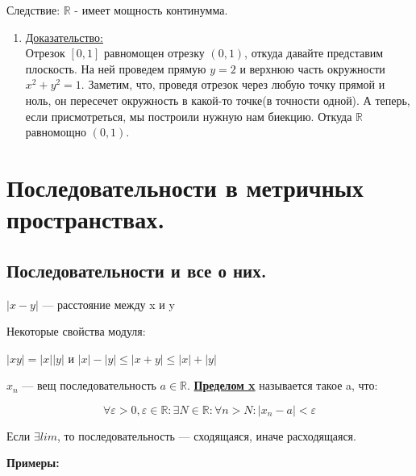 \documentclass{article}
\newcommand{\deff}[1]{\underline{\textbf{#1}}}
\newcommand{\prooff}[1]{{\underline{Доказательство:}} \\ }
\begin{document}
Следствие: $\mathbb{R}$ - имеет мощность континумма.

\begin{enumerate}
    \item[]\prooff{}
    Отрезок $[0,1]$ равномощен отрезку $(0,1)$, откуда давайте представим плоскость. На ней проведем прямую $y=2$ и верхнюю часть окружности $x^2+y^2 =1$. Заметим, что, проведя отрезок через любую точку прямой и ноль,  он пересечет окружность в какой-то точке(в точности одной). А теперь, если присмотреться, мы построили нужную нам биекцию. Откуда $\mathbb{R}$ равномощно $(0,1)$.
\end{enumerate}





















\pagebreak
\section{Последовательности в метричных пространствах.}

\subsection{Последовательности и все о них.}

$|x-y|$ --- расстояние между x и y

Некоторые свойства модуля: 

$|xy|=|x||y|$ и $|x|-|y|\leq |x+y| \leq |x|+|y|$

$x_n$ --- вещ последовательность $a \in \mathds{R}$. \deff{Пределом x} называется такое a, что:

\[\forall \varepsilon > 0, \varepsilon \in \mathds{R}: \exists N \in \mathds{R}: \forall n >N:|x_n-a|<\varepsilon \]

Если $ \exists lim$, то последовательность --- сходящаяся, иначе расходящаяся.

\textbf{Примеры:}
\end{document}
